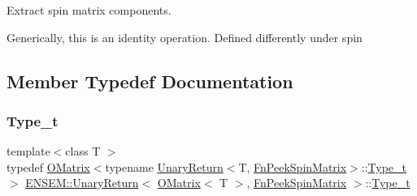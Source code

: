 Extract spin matrix components. 

Generically, this is an identity operation. Defined differently under spin 

\subsection{Member Typedef Documentation}
\mbox{\label{structENSEM_1_1UnaryReturn_3_01OMatrix_3_01T_01_4_00_01FnPeekSpinMatrix_01_4_a9a23ee99cd498ef33180f667eae28655}} 
\subsubsection{\texorpdfstring{Type\_t}{Type\_t}\hspace{0.1cm}{\footnotesize\ttfamily [1/2]}}
{\footnotesize\ttfamily template$<$class T $>$ \\
typedef \mbox{\hyperlink{classENSEM_1_1OMatrix}{O\+Matrix}}$<$typename \mbox{\hyperlink{structENSEM_1_1UnaryReturn}{Unary\+Return}}$<$T, \mbox{\hyperlink{structENSEM_1_1FnPeekSpinMatrix}{Fn\+Peek\+Spin\+Matrix}}$>$\+::\mbox{\hyperlink{structENSEM_1_1UnaryReturn_3_01OMatrix_3_01T_01_4_00_01FnPeekSpinMatrix_01_4_a9a23ee99cd498ef33180f667eae28655}{Type\+\_\+t}}$>$ \mbox{\hyperlink{structENSEM_1_1UnaryReturn}{E\+N\+S\+E\+M\+::\+Unary\+Return}}$<$ \mbox{\hyperlink{classENSEM_1_1OMatrix}{O\+Matrix}}$<$ T $>$, \mbox{\hyperlink{structENSEM_1_1FnPeekSpinMatrix}{Fn\+Peek\+Spin\+Matrix}} $>$\+::\mbox{\hyperlink{structENSEM_1_1UnaryReturn_3_01OMatrix_3_01T_01_4_00_01FnPeekSpinMatrix_01_4_a9a23ee99cd498ef33180f667eae28655}{Type\+\_\+t}}}

\mbox{\label{structENSEM_1_1UnaryReturn_3_01OMatrix_3_01T_01_4_00_01FnPeekSpinMatrix_01_4_a9a23ee99cd498ef33180f667eae28655}} 
